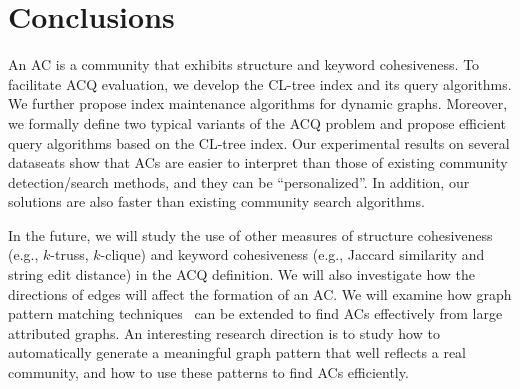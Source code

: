 \section{Conclusions}
\label{conclusion}

An AC is a community that exhibits structure and keyword cohesiveness. To facilitate ACQ evaluation, we develop the CL-tree index and its query algorithms. We further propose index maintenance algorithms for dynamic graphs.
Moreover, we formally define two typical variants of the ACQ problem and propose efficient query algorithms based on the CL-tree index.
Our experimental results on several dataseats show that ACs are easier to interpret than those of existing community detection/search methods, and they can be ``personalized''. In addition, our solutions are also faster than existing community search algorithms.

In the future, we will study the use of other measures of structure cohesiveness (e.g., $k$-truss, $k$-clique) and keyword cohesiveness (e.g., Jaccard similarity and string edit distance) in the ACQ definition.
We will also investigate how the directions of edges will affect the formation of an AC.
We will examine how graph pattern matching techniques~\cite{GPM-KDD2007,GPM-VLDB2010,GPM-PVLDB2015} can be extended to find ACs effectively from large attributed graphs. An interesting research direction is to study how to automatically generate a meaningful graph pattern that well reflects a real community, and how to use these patterns to find ACs efficiently. 